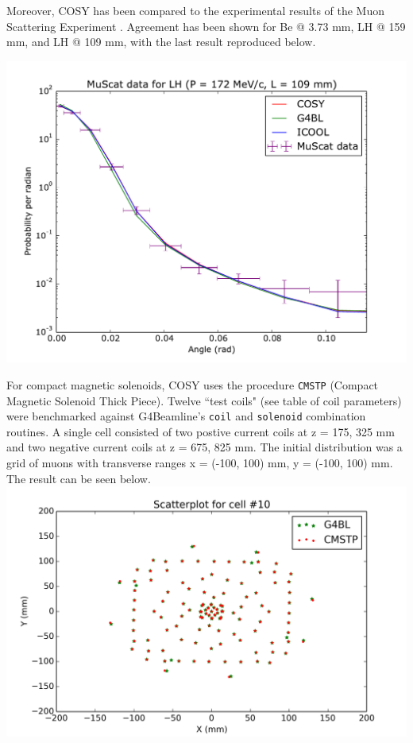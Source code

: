 \documentclass[portrait,a0paper,fontscale=0.285]{baposter} %
\begin{document}
\begin{poster}
{
Moreover, COSY has been compared to the experimental results of the Muon Scattering Experiment \cite{muscat}. Agreement has been shown for Be @ 3.73 mm, LH @ 159 mm, and LH @ 109 mm, with the last result reproduced below.

\includegraphics[width=\textwidth]{Figures/172.109.muscat.pdf}
}


{
For compact magnetic solenoids, COSY uses the procedure \texttt{CMSTP} (Compact Magnetic Solenoid Thick Piece). Twelve ``test coils" (see table of coil parameters) were benchmarked against G4Beamline's \texttt{coil} and \texttt{solenoid} combination routines. A single cell consisted of two postive current coils at z = 175, 325 mm and two negative current coils at z = 675, 825 mm. The initial distribution was a grid of muons with transverse ranges x = (-100, 100) mm, y = (-100, 100) mm. The result can be seen below.
\includegraphics[width=\textwidth]{Figures/grid_cell_10.png}

}
\end{poster}
\end{document}
